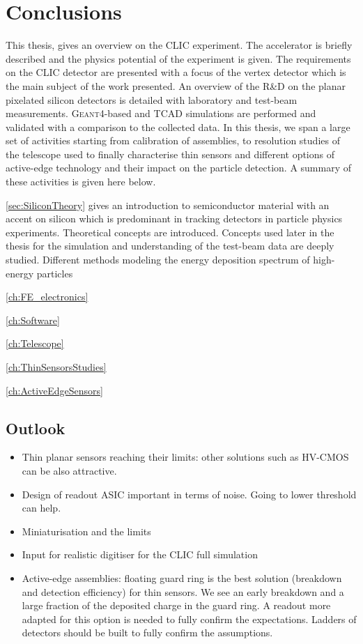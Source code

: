 \chapter{Conclusions}
\label{ch:conclusions}

This thesis, gives an overview on the CLIC experiment. The accelerator
is briefly described and the physics potential of the experiment is
given. The requirements on the CLIC detector are presented with a
focus of the vertex detector which is the main subject of the work
presented. An overview of the R\&D on the planar pixelated silicon
detectors is detailed with laboratory and test-beam
measurements. \textsc{Geant4}-based and TCAD simulations are performed
and validated with a comparison to the collected data. In this thesis,
we span a large set of activities starting from calibration of
assemblies, to resolution studies of the telescope used to finally
characterise thin sensors and different options of active-edge
technology and their impact on the particle detection. A summary of
these activities is given here below.

\cref{sec:SiliconTheory} gives an introduction to semiconductor
material with an accent on silicon which is predominant in tracking
detectors in particle physics experiments. Theoretical concepts are
introduced. Concepts used later in the thesis for the simulation and
understanding of the test-beam data are deeply studied. Different
methods modeling the energy deposition spectrum of high-energy
particles

\cref{ch:FE_electronics}

\cref{ch:Software}

\cref{ch:Telescope}

\cref{ch:ThinSensorsStudies}

\cref{ch:ActiveEdgeSensors}

\section{Outlook}
\begin{itemize}
\item Thin planar sensors reaching their limits: other solutions such
  as HV-CMOS can be also attractive.
\item Design of readout ASIC important in terms of noise. Going to
  lower threshold can help.
\item Miniaturisation and the limits
\item Input for realistic digitiser for the CLIC full simulation
\item Active-edge assemblies: floating guard ring is the best solution
  (breakdown and detection efficiency) for thin sensors. We see an
  early breakdown and a large fraction of the deposited charge in the
  guard ring. A readout more adapted for this option is needed to
  fully confirm the expectations. Ladders of detectors should be built
  to fully confirm the assumptions.
\end{itemize}
